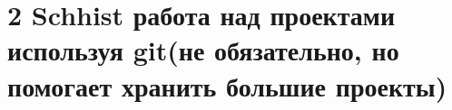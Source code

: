 \chapter{2 Schhist работа над проектами используя git(не обязательно, но помогает хранить большие проекты)}\label{kicad:schhist}
